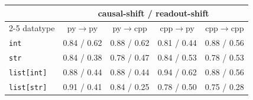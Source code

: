 \begin{tabular}{lcccc}
\toprule
& \multicolumn{4}{c}{causal-shift / readout-shift} \\
\cmidrule(lr){2-5}
datatype & py$\to$py & py$\to$cpp & cpp$\to$py & cpp$\to$cpp \\
\midrule
\texttt{int} & 0.84 / 0.62 & 0.88 / 0.62 & 0.81 / 0.44 & 0.88 / 0.56 \\
\texttt{str} & 0.84 / 0.38 & 0.78 / 0.47 & 0.84 / 0.53 & 0.78 / 0.53 \\
\texttt{list[int]} & 0.88 / 0.44 & 0.88 / 0.44 & 0.94 / 0.62 & 0.88 / 0.56 \\
\texttt{list[str]} & 0.91 / 0.41 & 0.84 / 0.25 & 0.78 / 0.50 & 0.75 / 0.28 \\
\bottomrule
\end{tabular}
